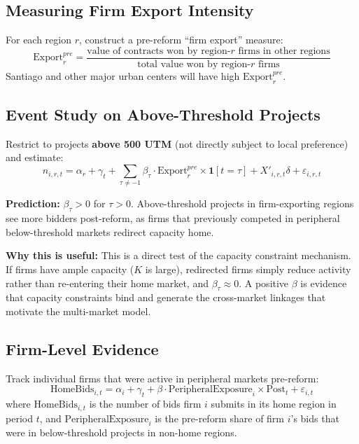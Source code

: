 \documentclass[12pt]{article}
\newcommand{\ind}{\mathbf{1}}
\begin{document}
\subsection{Measuring Firm Export Intensity}

For each region $r$, construct a pre-reform ``firm export'' measure:
\begin{equation}\label{eq:export}
    \text{Export}_{r}^{pre} = \frac{\text{value of contracts won by region-}r\text{ firms in other regions}}{\text{total value won by region-}r\text{ firms}}
\end{equation}
Santiago and other major urban centers will have high $\text{Export}_r^{pre}$.

\subsection{Event Study on Above-Threshold Projects}

Restrict to projects \textbf{above 500 UTM} (not directly subject to local preference) and estimate:
\begin{equation}\label{eq:es_spillover}
    n_{i,r,t} = \alpha_r + \gamma_t + \sum_{\tau \neq -1} \beta_\tau \cdot \text{Export}_{r}^{pre} \times \ind[t = \tau] + X'_{i,r,t}\delta + \varepsilon_{i,r,t}
\end{equation}

\textbf{Prediction:} $\beta_\tau > 0$ for $\tau > 0$. Above-threshold projects in firm-exporting regions see more bidders post-reform, as firms that previously competed in peripheral below-threshold markets redirect capacity home.

\textbf{Why this is useful:} This is a direct test of the capacity constraint mechanism. If firms have ample capacity ($K$ is large), redirected firms simply reduce activity rather than re-entering their home market, and $\beta_\tau \approx 0$. A positive $\beta$ is evidence that capacity constraints bind and generate the cross-market linkages that motivate the multi-market model.

\subsection{Firm-Level Evidence}

Track individual firms that were active in peripheral markets pre-reform:
\begin{equation}\label{eq:firm_spillover}
    \text{HomeBids}_{i,t} = \alpha_i + \gamma_t + \beta \cdot \text{PeripheralExposure}_i \times \text{Post}_t + \varepsilon_{i,t}
\end{equation}
where $\text{HomeBids}_{i,t}$ is the number of bids firm $i$ submits in its home region in period $t$, and $\text{PeripheralExposure}_i$ is the pre-reform share of firm $i$'s bids that were in below-threshold projects in non-home regions.
\end{document}
